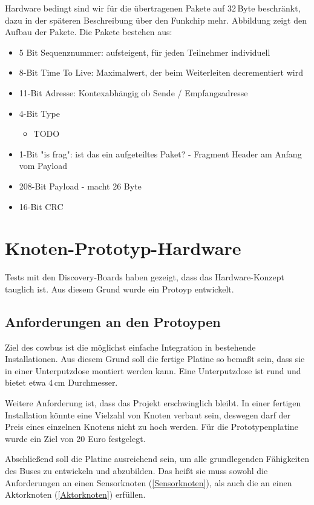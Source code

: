\documentclass{IEEEtran}
\begin{document}
        Hardware bedingt sind wir für die übertragenen Pakete auf 32\,Byte beschränkt, dazu in der späteren Beschreibung über den Funkchip mehr. Abbildung \label{fig:paket} zeigt den Aufbau der Pakete. Die Pakete bestehen aus:
        \begin{itemize}
            \item 5 Bit Sequenznummer: aufsteigent, für jeden Teilnehmer individuell
            \item 8-Bit Time To Live: Maximalwert, der beim Weiterleiten decrementiert wird
            \item 11-Bit Adresse: Kontexabhängig ob Sende / Empfangsadresse
            \item 4-Bit Type 
                \begin{itemize}
                    \item TODO
                \end{itemize}
            \item 1-Bit "is frag": ist das ein aufgeteiltes Paket? - Fragment Header am Anfang vom Payload
            \item 208-Bit Payload - macht 26 Byte
            \item 16-Bit CRC
        \end{itemize}
        
\section{Knoten-Prototyp-Hardware}
Tests mit den Discovery-Boards haben gezeigt, dass das Hardware-Konzept tauglich ist.
Aus diesem Grund wurde ein Protoyp entwickelt.

\subsection{Anforderungen an den Protoypen}
Ziel des cowbus ist die möglichst einfache Integration in bestehende Installationen.
Aus diesem Grund soll die fertige Platine so bemaßt sein, dass sie in einer Unterputzdose montiert werden kann.
Eine Unterputzdose ist rund und bietet etwa 4\,cm Durchmesser.

Weitere Anforderung ist, dass das Projekt erschwinglich bleibt.
In einer fertigen Installation könnte eine Vielzahl von Knoten verbaut sein, deswegen darf der Preis eines einzelnen Knotens nicht zu hoch werden.
Für die Prototypenplatine wurde ein Ziel von 20 Euro festgelegt.

Abschließend soll die Platine ausreichend sein, um alle grundlegenden Fähigkeiten des Buses zu entwickeln und abzubilden.
Das heißt sie muss sowohl die Anforderungen an einen Sensorknoten (\ref{Sensorknoten}), als auch die an einen Aktorknoten (\ref{Aktorknoten}) erfüllen.
\end{document}
